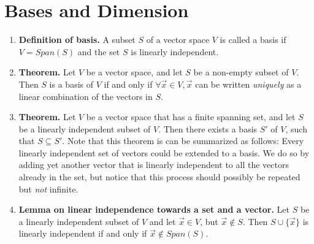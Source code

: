 \documentclass[oneside, 12pt]{book}
\newcommand{\settag}[1]{\renewcommand{\theenumi}{#1}}
\newcommand{\tbf}[1]{\textbf{#1}}
\newcommand{\tit}[1]{\textit{#1}}
\begin{document}
\section{Bases and Dimension}
    \begin{enumerate}
        \settag{1.6.1}
        \item \tbf{Definition of basis.} A subset $S$ of a vector space $V$ is called a basis if $V=Span(S)$ and the set $S$ is linearly independent.
        
        \settag{1.6.3}
        \item \tbf{Theorem. }Let $V$ be a vector space, and let $S$ be a non-empty subset of $V$. Then $S$ is a basis of $V$ if and only if $\forall \vec{x} \in V, \vec{x}$ can be written \tit{uniquely} as a linear combination of the vectors in $S$.
        
        \settag{1.6.6}
        \item \tbf{Theorem. }Let $V$ be a vector space that has a finite spanning set, and let $S$ be a linearly independent subset of $V$. Then there exists a basis $S'$ of $V$, such that $S\subseteq S'.$ Note that this theorem is can be summarized as follows: Every linearly independent set of vectors could be extended to a basis. We do so by adding yet another vector that is linearly independent to all the vectors already in the set, but notice that this process should possibly be repeated but \tit{not} infinite.
        
        \settag{1.6.8}
        \item \tbf{Lemma on linear independence towards a set and a vector.} Let $S$ be a linearly independent subset of $V$ and let $\vec{x}\in V$, but $\vec{x} \notin S$. Then $S\cup \{\vec{x} \}$ is linearly independent if and only if $\vec{x} \notin Span(S)$.
        

\end{enumerate}
\end{document}
